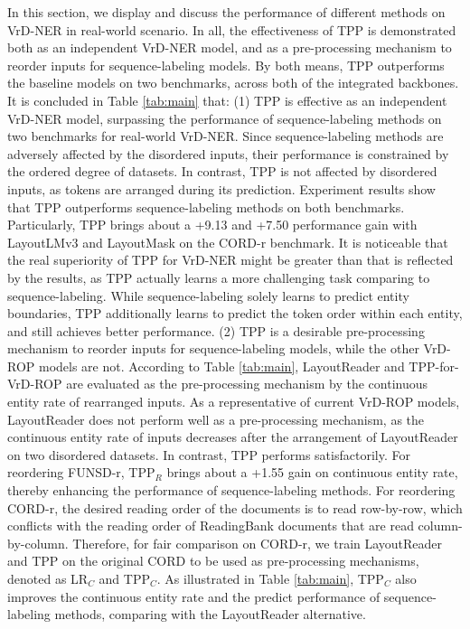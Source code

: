 \documentclass[11pt]{article}
\begin{document}
In this section, we display and discuss the performance of different methods on VrD-NER in real-world scenario.
In all, the effectiveness of TPP is demonstrated both as an independent VrD-NER model, and as a pre-processing mechanism to reorder inputs for sequence-labeling models. 
By both means, TPP outperforms the baseline models on two benchmarks, across both of the integrated backbones.
It is concluded in Table \ref{tab:main} that: 
(1) TPP is effective as an independent VrD-NER model, surpassing the performance of sequence-labeling methods on two benchmarks for real-world VrD-NER. 
Since sequence-labeling methods are adversely affected by the disordered inputs, their performance is constrained by the ordered degree of datasets. 
In contrast, TPP is not affected by disordered inputs, as tokens are arranged during its prediction. 
Experiment results show that TPP outperforms sequence-labeling methods on both benchmarks. Particularly, TPP brings about a +9.13 and +7.50 performance gain with LayoutLMv3 and LayoutMask on the CORD-r benchmark. 
It is noticeable that the real superiority of TPP for VrD-NER might be greater than that is reflected by the results, as TPP actually learns a more challenging task comparing to sequence-labeling. While sequence-labeling solely learns to predict entity boundaries, TPP additionally learns to predict the token order within each entity, and still achieves better performance. 
(2) TPP is a desirable pre-processing mechanism to reorder inputs for sequence-labeling models, while the other VrD-ROP models are not. 
According to Table \ref{tab:main}, LayoutReader and TPP-for-VrD-ROP are evaluated as the pre-processing mechanism by the continuous entity rate of rearranged inputs. 
As a representative of current VrD-ROP models, LayoutReader does not perform well as a pre-processing mechanism, as the continuous entity rate of inputs decreases after the arrangement of LayoutReader on two disordered datasets. 
In contrast, TPP performs satisfactorily. 
For reordering FUNSD-r, TPP$_R$ brings about a +1.55 gain on continuous entity rate, thereby enhancing the performance of sequence-labeling methods.
For reordering CORD-r, the desired reading order of the documents is to read row-by-row, which conflicts with the reading order of ReadingBank documents that are read column-by-column. 
Therefore, for fair comparison on CORD-r, we train LayoutReader and TPP on the original CORD to be used as pre-processing mechanisms, denoted as LR$_C$ and TPP$_C$.
As illustrated in Table \ref{tab:main}, TPP$_C$ also improves the continuous entity rate and the predict performance of sequence-labeling methods, comparing with the LayoutReader alternative. 
\end{document}
